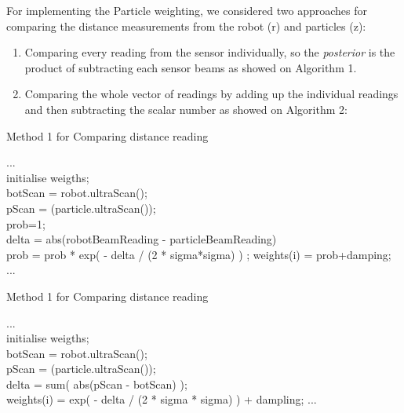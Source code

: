 
	For implementing the Particle weighting,  we considered two approaches for comparing the distance measurements from the robot (r) and particles (z):
	
		\begin{enumerate}
			\item Comparing every reading from the sensor individually, so the \textit{posterior} is the product of subtracting each sensor beams as showed on Algorithm 1. 
			\item Comparing the whole vector of readings by adding up the individual readings and then subtracting the scalar number as showed on Algorithm 2:
		\end{enumerate}
	
		\vspace{1em}
		\begin{algorithm}[H]
			\caption{Method 1 for Comparing distance reading} \label{alg:method2}
			... \\
			initialise weigths; \\
			botScan = robot.ultraScan(); \\
			
			 {
				pScan = (particle.ultraScan());\\
				prob=1;\\ 
				 {
					delta =  abs(robotBeamReading - particleBeamReading)\\
					prob = prob * exp( - delta / (2 * sigma*sigma) ) ;}
				weights(i) = prob+damping;}
			...\\
		\end{algorithm}
		\vspace{1em}
			
	
		\vspace{1em}
		\begin{algorithm}[H]
			\caption{Method 1 for Comparing distance reading} \label{alg:method1}
			... \\
			initialise weigths; \\
			botScan = robot.ultraScan(); \\
	 
			 {
				pScan = (particle.ultraScan());\\ 
				delta = sum( abs(pScan - botScan) );\\
				weights(i) = exp( - delta / (2 * sigma * sigma) ) + dampling;}
			...\\
		\end{algorithm}
		\vspace{1em}
	
